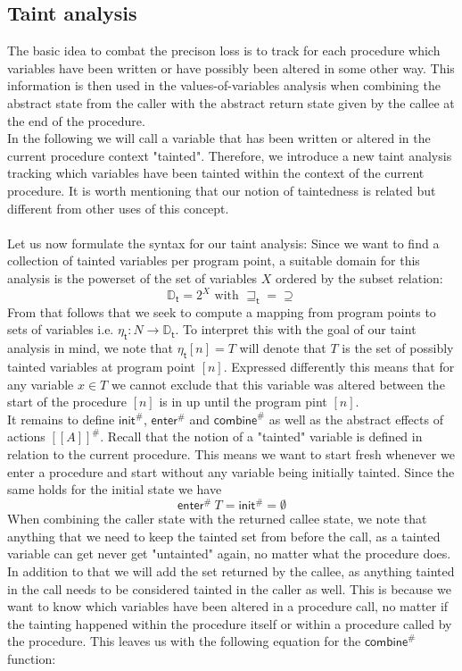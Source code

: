     \subsection{Taint analysis}
      The basic idea to combat the precison loss is to track for each procedure which variables have been written or have possibly been altered in some other way. This information is then used in the values-of-variables analysis when combining the abstract state from the caller with the abstract return state given by the callee at the end of the procedure.\\
      In the following we will call a variable that has been written or altered in the current procedure context "tainted". Therefore, we introduce a new taint analysis tracking which variables have been tainted within the context of the current procedure. It is worth mentioning that our notion of taintedness is related but different from other uses of this concept.\\
      \\
      Let us now formulate the syntax for our taint analysis:
      Since we want to find a collection of tainted variables per program point, a suitable domain for this analysis is the powerset of the set of variables $X$ ordered by the subset relation:
      \[\mathbb{D}_\textsf{t} = 2^X \text{ with } \sqsupseteq_\textsf{t} = \supseteq\]
      From that follows that we seek to compute a mapping from program points to sets of variables i.e. $\eta_\textsf{t}: N \rightarrow \mathbb{D}_\textsf{t}$. To interpret this with the goal of our taint analysis in mind, we note that $\eta_\textsf{t} [n] = T$ will denote that $T$ is the set of possibly tainted variables at program point $[n]$. Expressed differently this means that for any variable $x \in T$ we cannot exclude that this variable was altered between the start of the procedure $[n]$ is in up until the program pint $[n]$.\\
      It remains to define $\textsf{init}^{\#}$, $\textsf{enter}^{\#}$ and $\textsf{combine}^{\#}$ as well as the abstract effects of actions $[\![  A ]\!]^{\#}$. Recall that the notion of a "tainted" variable is defined in relation to the current procedure. This means we want to start fresh whenever we enter a procedure and start without any variable being initially tainted. Since the same holds for the initial state we have 
      \[\textsf{enter}^{\#}\ T = \textsf{init}^{\#} = \emptyset\]
      When combining the caller state with the returned callee state, we note that anything that we need to keep the tainted set from before the call, as a tainted variable can get never get "untainted" again, no matter what the procedure does. In addition to that we will add the set returned by the callee, as anything tainted in the call needs to be considered tainted in the caller as well. This is because we want to know which variables have been altered in a procedure call, no matter if the tainting happened within the procedure itself or within a procedure called by the procedure. This leaves us with the following equation for the $\textsf{combine}^{\#}$ function:
